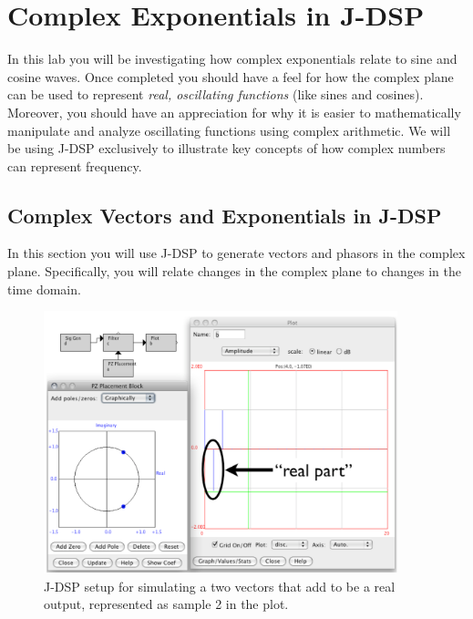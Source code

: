 


\section{Complex Exponentials in J-DSP}


In this lab you will be investigating how complex exponentials relate
to sine and cosine waves. Once completed you should have a feel for
how the complex plane can be used to represent \textit{real,
  oscillating functions} (like sines and cosines). Moreover, you
should have an appreciation for why it is easier to mathematically
manipulate and analyze oscillating functions using complex
arithmetic. We will be using J-DSP exclusively to illustrate key
concepts of how complex numbers can represent frequency.

\subsection{Complex Vectors and Exponentials in J-DSP}
\label{sc:jdsp-sines}
In this section you will use J-DSP to generate vectors and phasors in the complex plane. Specifically, you will relate changes in the complex plane to changes in the time domain.

\begin{figure}[t]
  \begin{center}
    \includegraphics[height=3in]{lab2/PoleZeroAsComplexVector}
  \end{center}
\caption{J-DSP setup for simulating a two vectors that add to be a real output, represented as sample 2 in the plot.\label{fg:PoleZeroAsComplexVec}}
\end{figure}

